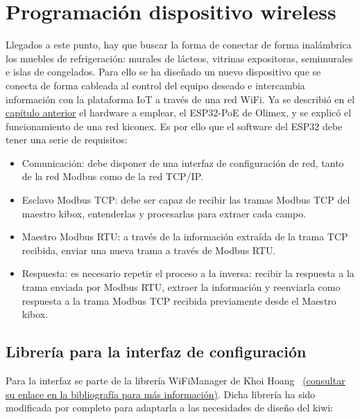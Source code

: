 \section{Programación dispositivo wireless}
\label{sec:programacionesp32}
Llegados a este punto, hay que buscar la forma de conectar de forma inalámbrica los muebles de refrigeración: murales de lácteos, vitrinas expositoras, semimurales e islas de congelados. Para ello se ha diseñado un nuevo dispositivo que se conecta de forma cableada al control del equipo deseado e intercambia información con la plataforma IoT a través de una red WiFi. Ya se describió en el \hyperref[chap:estadoArte]{capítulo anterior} el hardware a emplear, el ESP32-PoE de Olimex, y se explicó el funcionamiento de una red kiconex. Es por ello que el software del ESP32 debe tener una serie de requisitos:

\begin{itemize}
  \item Comunicación: debe disponer de una interfaz de configuración de red, tanto de la red Modbus como de la red TCP/IP.
  \item Esclavo Modbus TCP: debe ser capaz de recibir las tramas Modbus TCP del maestro kibox, entenderlas y procesarlas para extraer cada campo.
  \item Maestro Modbus RTU: a través de la información extraída de la trama TCP recibida, enviar una nueva trama a través de Modbus RTU.
  \item Respuesta: es necesario repetir el proceso a la inversa: recibir la respuesta a la trama enviada por Modbus RTU, extraer la información y reenviarla como respuesta a la trama Modbus TCP recibida previamente desde el Maestro kibox.
\end{itemize}

\subsection{Librería para la interfaz de configuración}
\label{subsec:interfazKiwi}
Para la interfaz se parte de la librería WiFiManager de Khoi Hoang~\cite{libreriaWiFigithub} \href{https://github.com/khoih-prog/ESP_WiFiManager}{(consultar su enlace en la bibliografía para más información)}. Dicha librería ha sido modificada por completo para adaptarla a las necesidades de diseño del kiwi:

